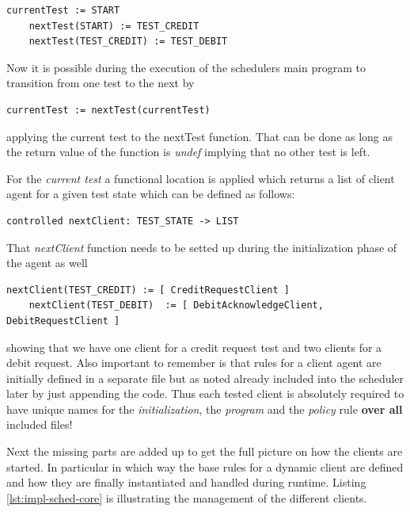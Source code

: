 \begin{lstlisting}[language=bsl]
	currentTest := START
	nextTest(START) := TEST_CREDIT
	nextTest(TEST_CREDIT) := TEST_DEBIT
\end{lstlisting}

Now it is possible during the execution of the schedulers main program to transition from one test to the next by

\begin{lstlisting}[language=bsl]
	currentTest := nextTest(currentTest)
\end{lstlisting}

applying the current test to the nextTest function. That can be done as long as the return value of the function is \textit{undef} implying that no other test is left.

For the \textit{current test} a functional location is applied which returns a list of client agent for a given test state which can be defined as follows:

\begin{lstlisting}[language=bsl]
	controlled nextClient: TEST_STATE -> LIST
\end{lstlisting}

That \textit{nextClient} function needs to be setted up during the initialization phase of the agent as well

\begin{lstlisting}[language=bsl]
	nextClient(TEST_CREDIT) := [ CreditRequestClient ]
	nextClient(TEST_DEBIT)  := [ DebitAcknowledgeClient, DebitRequestClient ]
\end{lstlisting}

showing that we have one client for a credit request test and two clients for a debit request. Also important to remember is that rules for a client agent are initially defined in a separate file but as noted already included into the scheduler later by just appending the code. Thus each tested client is absolutely required to have unique names for the \textit{initialization}, the \textit{program} and the \textit{policy} rule \textbf{over all} included files!

Next the missing parts are added up to get the full picture on how the clients are started. In particular in which way the base rules for a dynamic client are defined and how they are finally instantiated and handled during runtime. Listing \ref{lst:impl-sched-core} is illustrating the management of the different clients.

